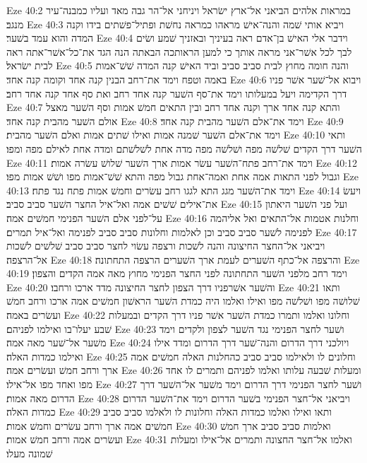 Eze 40:2  במראות אלהים הביאני אל־ארץ ישׂראל ויניחני אל־הר גבה מאד ועליו כמבנה־עיר מנגב׃
Eze 40:3  ויביא אותי שׁמה והנה־אישׁ מראהו כמראה נחשׁת ופתיל־פשׁתים בידו וקנה המדה והוא עמד בשׁער׃
Eze 40:4  וידבר אלי האישׁ בן־אדם ראה בעיניך ובאזניך שׁמע ושׂים לבך לכל אשׁר־אני מראה אותך כי למען הראותכה הבאתה הנה הגד את־כל־אשׁר־אתה ראה לבית ישׂראל׃
Eze 40:5  והנה חומה מחוץ לבית סביב סביב וביד האישׁ קנה המדה שׁשׁ־אמות באמה וטפח וימד את־רחב הבנין קנה אחד וקומה קנה אחד׃
Eze 40:6  ויבוא אל־שׁער אשׁר פניו דרך הקדימה ויעל במעלותו וימד את־סף השׁער קנה אחד רחב ואת סף אחד קנה אחד רחב׃
Eze 40:7  והתא קנה אחד ארך וקנה אחד רחב ובין התאים חמשׁ אמות וסף השׁער מאצל אולם השׁער מהבית קנה אחד׃
Eze 40:8  וימד את־אלם השׁער מהבית קנה אחד׃
Eze 40:9  וימד את־אלם השׁער שׁמנה אמות ואילו שׁתים אמות ואלם השׁער מהבית׃
Eze 40:10  ותאי השׁער דרך הקדים שׁלשׁה מפה ושׁלשׁה מפה מדה אחת לשׁלשׁתם ומדה אחת לאילם מפה ומפו׃
Eze 40:11  וימד את־רחב פתח־השׁער עשׂר אמות ארך השׁער שׁלושׁ עשׂרה אמות׃
Eze 40:12  וגבול לפני התאות אמה אחת ואמה־אחת גבול מפה והתא שׁשׁ־אמות מפו ושׁשׁ אמות מפו׃
Eze 40:13  וימד את־השׁער מגג התא לגגו רחב עשׂרים וחמשׁ אמות פתח נגד פתח׃
Eze 40:14  ויעשׂ את־אילים שׁשׁים אמה ואל־איל החצר השׁער סביב סביב׃
Eze 40:15  ועל פני השׁער היאתון על־לפני אלם השׁער הפנימי חמשׁים אמה׃
Eze 40:16  וחלנות אטמות אל־התאים ואל אליהמה לפנימה לשׁער סביב סביב וכן לאלמות וחלונות סביב סביב לפנימה ואל־איל תמרים׃
Eze 40:17  ויביאני אל־החצר החיצונה והנה לשׁכות ורצפה עשׂוי לחצר סביב סביב שׁלשׁים לשׁכות אל־הרצפה׃
Eze 40:18  והרצפה אל־כתף השׁערים לעמת ארך השׁערים הרצפה התחתונה׃
Eze 40:19  וימד רחב מלפני השׁער התחתונה לפני החצר הפנימי מחוץ מאה אמה הקדים והצפון׃
Eze 40:20  והשׁער אשׁרפניו דרך הצפון לחצר החיצונה מדד ארכו ורחבו׃
Eze 40:21  ותאו שׁלושׁה מפו ושׁלשׁה מפו ואילו ואלמו היה כמדת השׁער הראשׁון חמשׁים אמה ארכו ורחב חמשׁ ועשׂרים באמה׃
Eze 40:22  וחלונו ואלמו ותמרו כמדת השׁער אשׁר פניו דרך הקדים ובמעלות שׁבע יעלו־בו ואילמו לפניהם׃
Eze 40:23  ושׁער לחצר הפנימי נגד השׁער לצפון ולקדים וימד משׁער אל־שׁער מאה אמה׃
Eze 40:24  ויולכני דרך הדרום והנה־שׁער דרך הדרום ומדד אילו ואילמו כמדות האלה׃
Eze 40:25  וחלונים לו ולאילמו סביב סביב כהחלנות האלה חמשׁים אמה ארך ורחב חמשׁ ועשׂרים אמה׃
Eze 40:26  ומעלות שׁבעה עלותו ואלמו לפניהם ותמרים לו אחד מפו ואחד מפו אל־אילו׃
Eze 40:27  ושׁער לחצר הפנימי דרך הדרום וימד משׁער אל־השׁער דרך הדרום מאה אמות׃
Eze 40:28  ויביאני אל־חצר הפנימי בשׁער הדרום וימד את־השׁער הדרום כמדות האלה׃
Eze 40:29  ותאו ואילו ואלמו כמדות האלה וחלונות לו ולאלמו סביב סביב חמשׁים אמה ארך ורחב עשׂרים וחמשׁ אמות׃
Eze 40:30  ואלמות סביב סביב ארך חמשׁ ועשׂרים אמה ורחב חמשׁ אמות׃
Eze 40:31  ואלמו אל־חצר החצונה ותמרים אל־אילו ומעלות שׁמונה מעלו׃
